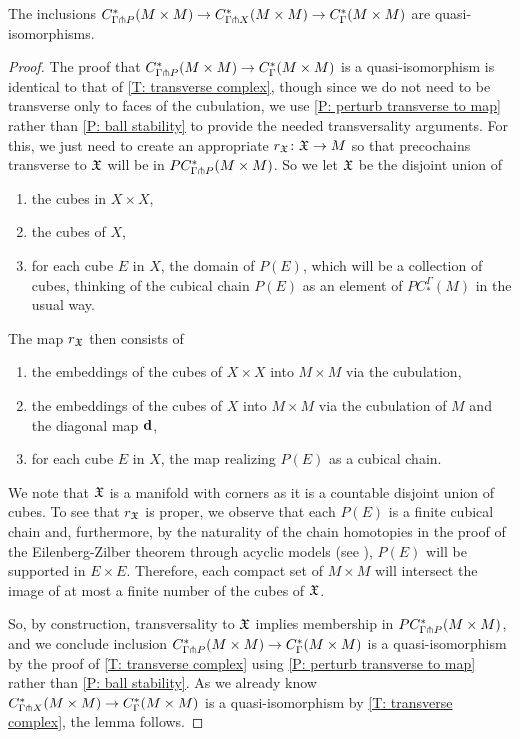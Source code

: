 \begin{lemma}\label{L: P-transverse iso}
	The inclusions $C^*_{\Gamma \pitchfork P} (M \times M) \to C^*_{\Gamma \pitchfork X} (M \times M) \to C^*_\Gamma (M \times M)$ are quasi-isomorphisms.
\end{lemma}
\begin{proof}
	The proof that $C^*_{\Gamma \pitchfork P} (M \times M)  \to C^*_\Gamma (M \times M)$ is a quasi-isomorphism is identical to that of \cref{T: transverse complex}, though since we do not need to be transverse only to faces of the cubulation, we use \cref{P: perturb transverse to map} rather than \cref{P: ball stability} to provide the needed transversality arguments.
	For this, we just need to create an appropriate $r_{\mathfrak X}  \colon \mathfrak X \to M$ so that precochains transverse to $\mathfrak X$ will be in $PC^*_{\Gamma \pitchfork P} (M \times M)$.
	So we let $\mathfrak X$ be the disjoint union of
	\begin{enumerate}
		\item the cubes in $X \times X$,
		\item the cubes of $X$,
		\item for each cube $E$ in $X$, the domain of $P(E)$, which will be a collection of cubes, thinking of the cubical chain $P(E)$ as an element of $PC^\Gamma_*(M)$ in the usual way.
	\end{enumerate}
	The map $r_{\mathfrak X}$ then consists of
	\begin{enumerate}
		\item the embeddings of the cubes of $X \times X$ into $M \times M$ via the cubulation,
		\item the embeddings of the cubes of $X$ into $M \times M$ via the cubulation of $M$ and the diagonal map $\mathbf{d}$,
		\item for each cube $E$ in $X$, the map realizing $P(E)$ as a cubical chain.
	\end{enumerate}
	We note that $\mathfrak X$ is a manifold with corners as it is a countable disjoint union of cubes.
	To see that $r_{\mathfrak X}$ is proper, we observe that each $P(E)$ is a finite cubical chain and, furthermore, by the naturality of the chain homotopies in the proof of the Eilenberg-Zilber theorem through acyclic models (see \cite[Section XI.5]{Mas91}), $P(E)$ will be supported in $E \times E$.
	Therefore, each compact set of $M \times M$ will intersect the image of at most a finite number of the cubes of $\mathfrak X$.

	So, by construction, transversality to $\mathfrak X$ implies membership in $PC^*_{\Gamma \pitchfork P} (M \times M)$, and we conclude inclusion $C^*_{\Gamma \pitchfork P} (M \times M) \to C^*_\Gamma (M \times M)$ is a quasi-isomorphism by the proof of \cref{T: transverse complex} using \cref{P: perturb transverse to map} rather than \cref{P: ball stability}.
	As we already know $C^*_{\Gamma \pitchfork X} (M \times M) \to C^*_\Gamma (M \times M)$ is a quasi-isomorphism by \cref{T: transverse complex}, the lemma follows.
\end{proof}

